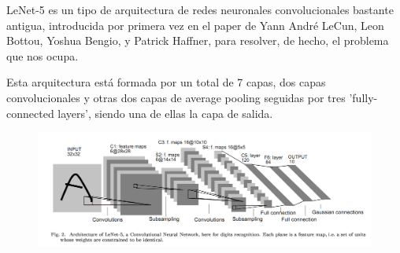 \documentclass[a4paper,11pt]{article}
\begin{document}
LeNet-5 es un tipo de arquitectura de redes neuronales convolucionales bastante antigua, introducida por primera vez en el paper \cite{7} de Yann André LeCun, Leon Bottou, Yoshua Bengio, y Patrick Haffner, para resolver, de hecho, el problema que nos ocupa.

Esta arquitectura está formada por un total de 7 capas, dos capas convolucionales y otras dos capas de average pooling seguidas por tres 'fully-connected layers',  siendo una de ellas la capa de salida. 

\begin{figure}[H]
	\centering
	\includegraphics[width=1.1\linewidth]{img/lenet}
	\caption{}
	\label{fig:lenet}
\end{figure}
\end{document}
